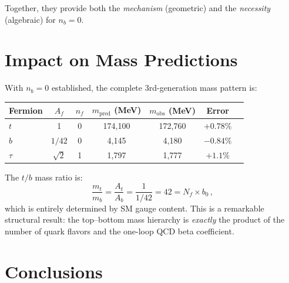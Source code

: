 \documentclass[11pt,a4paper]{article}
\theoremstyle{definition}
\theoremstyle{remark}
\begin{document}
Together, they provide both the \emph{mechanism} (geometric) and the
\emph{necessity} (algebraic) for $n_b = 0$.

\section{Impact on Mass Predictions}
\label{sec:impact}

With $n_b = 0$ established, the complete 3rd-generation mass pattern is:

\begin{center}
\renewcommand{\arraystretch}{1.3}
\begin{tabular}{lcccccc}
\toprule
Fermion & $A_f$ & $n_f$ & $m_{\text{pred}}$ (MeV) & $m_{\text{obs}}$ (MeV) & Error \\
\midrule
$t$ & 1 & 0 & 174{,}100 & 172{,}760 & $+0.78\%$ \\
$b$ & $1/42$ & 0 & 4{,}145 & 4{,}180 & $-0.84\%$ \\
$\tau$ & $\sqrt{2}$ & 1 & 1{,}797 & 1{,}777 & $+1.1\%$ \\
\bottomrule
\end{tabular}
\end{center}

The $t/b$ mass ratio is:
\begin{equation}
\frac{m_t}{m_b} = \frac{A_t}{A_b} = \frac{1}{1/42} = 42 = N_f \times b_0\,,
\end{equation}
which is entirely determined by SM gauge content.  This is a remarkable
structural result: the top--bottom mass hierarchy is \emph{exactly}
the product of the number of quark flavors and the one-loop QCD beta
coefficient.

\section{Conclusions}
\label{sec:conclusions}
\end{document}

